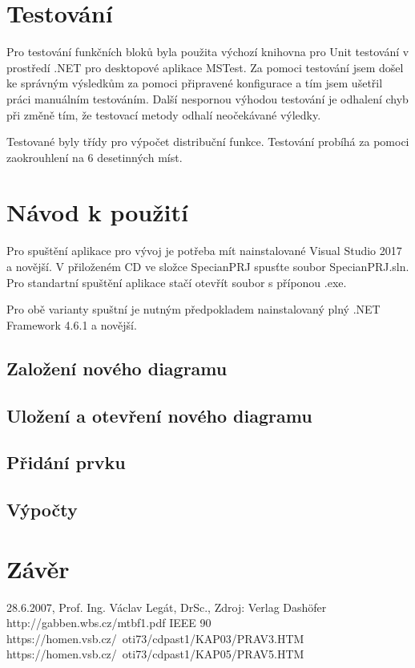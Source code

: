 \documentclass[FM,RP]{tulthesis}
\begin{document}
\chapter{Testování}

    Pro testování funkčních bloků byla použita výchozí knihovna pro Unit testování v prostředí .NET pro desktopové aplikace MSTest.
    Za pomoci testování jsem došel ke správným výsledkům za pomoci připravené konfigurace a tím jsem ušetřil práci manuálním testováním.
    Další nespornou výhodou testování je odhalení chyb při změně tím,  že testovací metody odhalí neočekávané výledky.

    Testované byly třídy pro výpočet distribuční funkce. Testování probíhá za pomoci zaokrouhlení na 6 desetinných míst.

\chapter{Návod k použití}

    Pro spuštění aplikace pro vývoj je potřeba mít nainstalované Visual Studio 2017 a novější. V přiloženém CD ve složce SpecianPRJ spusťte soubor SpecianPRJ.sln. 
    Pro standartní spuštění aplikace stačí otevřít soubor s příponou .exe.

    Pro obě varianty spuštní je nutným předpokladem nainstalovaný plný .NET Framework 4.6.1 a novější. 

    \section*{Založení nového diagramu}
    \section*{Uložení a otevření nového diagramu}
    \section*{Přidání prvku}
    \section*{Výpočty}

\chapter{Závěr}



\begin{thebibliography}{Mm99}
        28.6.2007, Prof. Ing. Václav Legát, DrSc., Zdroj: Verlag Dashöfer
        http://gabben.wbs.cz/mtbf1.pdf
        IEEE 90
        https://homen.vsb.cz/~oti73/cdpast1/KAP03/PRAV3.HTM
        https://homen.vsb.cz/~oti73/cdpast1/KAP05/PRAV5.HTM
\end{thebibliography}
\end{document}
